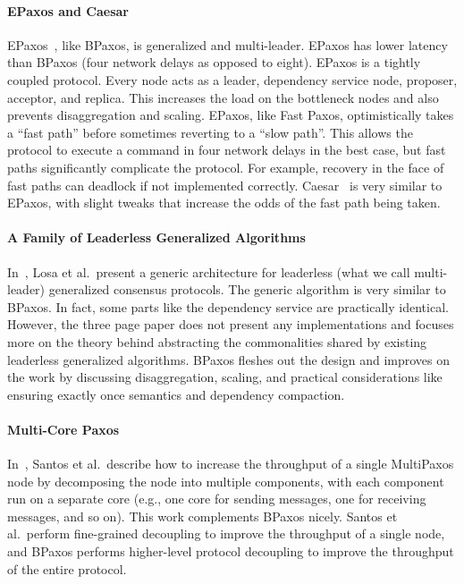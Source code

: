 \paragraph{EPaxos and Caesar}
EPaxos~\cite{moraru2013there, moraru2013proof}, like BPaxos, is generalized and
multi-leader. EPaxos has lower latency than BPaxos (four network delays as
opposed to eight). EPaxos is a tightly coupled protocol. Every node acts as a
leader, dependency service node, proposer, acceptor, and replica. This
increases the load on the bottleneck nodes and also prevents disaggregation and
scaling. EPaxos, like Fast Paxos, optimistically takes a ``fast path'' before
sometimes reverting to a ``slow path''. This allows the protocol to execute a
command in four network delays in the best case, but fast paths significantly
complicate the protocol. For example, recovery in the face of fast paths can
deadlock if not implemented correctly. Caesar~\cite{arun2017speeding} is very
similar to EPaxos, with slight tweaks that increase the odds of the fast path
being taken.

\paragraph{A Family of Leaderless Generalized Algorithms}
In~\cite{losa2016brief}, Losa et al.\ present a generic architecture for
leaderless (what we call multi-leader) generalized consensus protocols. The
generic algorithm is very similar to BPaxos. In fact, some parts like the
dependency service are practically identical. However, the three page paper
does not present any implementations and focuses more on the theory behind
abstracting the commonalities shared by existing leaderless generalized
algorithms. BPaxos fleshes out the design and improves on the work by
discussing disaggregation, scaling, and practical considerations like ensuring
exactly once semantics and dependency compaction.

\paragraph{Multi-Core Paxos}
In~\cite{santos2013achieving}, Santos et al.\ describe how to increase the
throughput of a single MultiPaxos node by decomposing the node into multiple
components, with each component run on a separate core (e.g., one core for
sending messages, one for receiving messages, and so on). This work complements
BPaxos nicely. Santos et al.\ perform fine-grained decoupling to improve the
throughput of a single node, and BPaxos performs higher-level protocol
decoupling to improve the throughput of the entire protocol.

